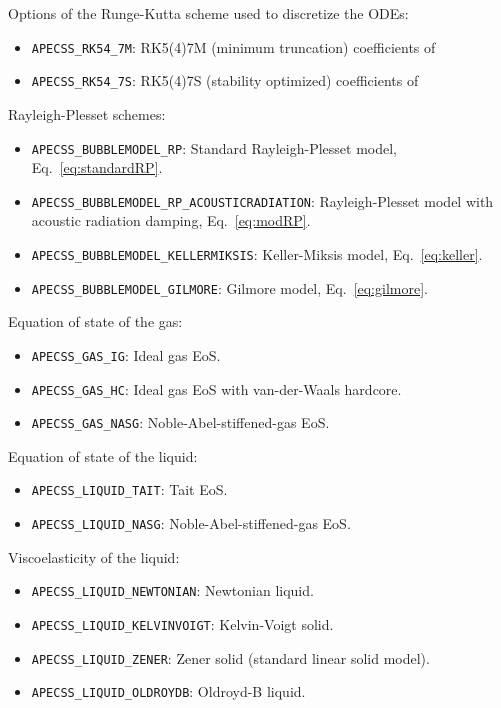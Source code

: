 Options of the Runge-Kutta scheme used to discretize the ODEs:\vspace{-1em}
\begin{itemize}[noitemsep]
  \item {\tt APECSS\_RK54\_7M}: RK5(4)7M (minimum truncation) coefficients of \citet{Dormand1980}
  \item {\tt APECSS\_RK54\_7S}: RK5(4)7S (stability optimized) coefficients of \citet{Dormand1980}
\end{itemize}

Rayleigh-Plesset schemes:\vspace{-1em}
\begin{itemize}[noitemsep]
  \item {\tt APECSS\_BUBBLEMODEL\_RP}: Standard Rayleigh-Plesset model, Eq.~\eqref{eq:standardRP}.
  \item {\tt APECSS\_BUBBLEMODEL\_RP\_ACOUSTICRADIATION}: Rayleigh-Plesset model with acoustic radiation damping, Eq.~\eqref{eq:modRP}.
  \item {\tt APECSS\_BUBBLEMODEL\_KELLERMIKSIS}: Keller-Miksis model, Eq.~\eqref{eq:keller}.
  \item {\tt APECSS\_BUBBLEMODEL\_GILMORE}: Gilmore model, Eq.~\eqref{eq:gilmore}.
\end{itemize}

Equation of state of the gas:\vspace{-1em}
\begin{itemize}[noitemsep]
  \item {\tt APECSS\_GAS\_IG}: Ideal gas EoS.
  \item {\tt APECSS\_GAS\_HC}: Ideal gas EoS with van-der-Waals hardcore.
  \item {\tt APECSS\_GAS\_NASG}: Noble-Abel-stiffened-gas EoS.
\end{itemize}

Equation of state of the liquid:\vspace{-1em}
\begin{itemize}[noitemsep]
  \item {\tt APECSS\_LIQUID\_TAIT}: Tait EoS.
  \item {\tt APECSS\_LIQUID\_NASG}: Noble-Abel-stiffened-gas EoS.
\end{itemize}

Viscoelasticity of the liquid:\vspace{-1em}
\begin{itemize}[noitemsep]
  \item {\tt APECSS\_LIQUID\_NEWTONIAN}: Newtonian liquid.
  \item {\tt APECSS\_LIQUID\_KELVINVOIGT}: Kelvin-Voigt solid.
  \item {\tt APECSS\_LIQUID\_ZENER}: Zener solid (standard linear solid model).
  \item {\tt APECSS\_LIQUID\_OLDROYDB}: Oldroyd-B liquid.
\end{itemize}

